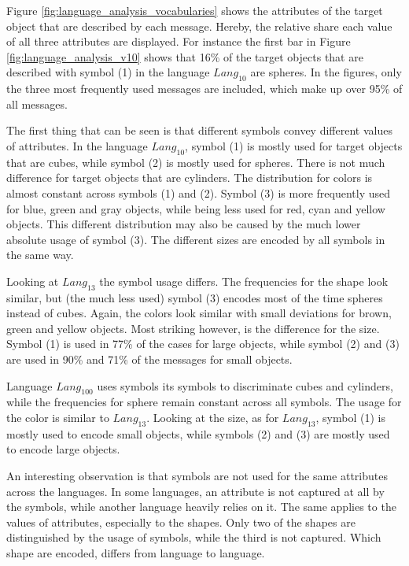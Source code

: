 
Figure \ref{fig:language_analysis_vocabularies} shows the attributes of the target object that are described by each message.
Hereby, the relative share each value of all three attributes are displayed.
For instance the first bar in Figure \ref{fig:language_analysis_v10} shows that 16\% of the target objects that are described with symbol (1) in the language $Lang_{10}$ are spheres.
In the figures, only the three most frequently used messages are included, which make up over 95\% of all messages.

The first thing that can be seen is that different symbols convey different values of attributes.
In the language $Lang_{10}$, symbol (1) is mostly used for target objects that are cubes, while symbol (2) is mostly used for spheres.
There is not much difference for target objects that are cylinders.
The distribution for colors is almost constant across symbols (1) and (2).
Symbol (3) is more frequently used for blue, green and gray objects, while being less used for red, cyan and yellow objects.
This different distribution may also be caused by the much lower absolute usage of symbol (3).
The different sizes are encoded by all symbols in the same way.

Looking at $Lang_{13}$ the symbol usage differs.
The frequencies for the shape look similar, but (the much less used) symbol (3) encodes most of the time spheres instead of cubes.
Again, the colors look similar with small deviations for brown, green and yellow objects.
Most striking however, is the difference for the size.
Symbol (1) is used in 77\% of the cases for large objects, while symbol (2) and (3) are used in 90\% and 71\% of the messages for small objects.

Language $Lang_{100}$ uses symbols its symbols to discriminate cubes and cylinders, while the frequencies for sphere remain constant across all symbols.
The usage for the color is similar to $Lang_{13}$.
Looking at the size, as for $Lang_{13}$, symbol (1) is mostly used to encode small objects, while symbols (2) and (3) are mostly used to encode large objects.

An interesting observation is that symbols are not used for the same attributes across the languages.
In some languages, an attribute is not captured at all by the symbols, while another language heavily relies on it.
The same applies to the values of attributes, especially to the shapes.
Only two of the shapes are distinguished by the usage of symbols, while the third is not captured.
Which shape are encoded, differs from language to language.

